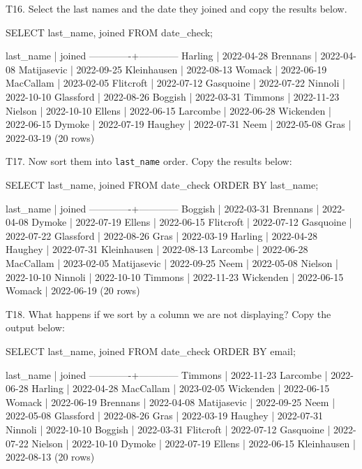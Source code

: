 T16. Select the last names and the date they joined and copy the results below. 
\begin{sql}
SELECT last_name, joined FROM date_check;
\end{sql}
\begin{pseudo}
  last_name  |   joined
-------------+------------
 Harling     | 2022-04-28
 Brennans    | 2022-04-08
 Matijasevic | 2022-09-25
 Kleinhausen | 2022-08-13
 Womack      | 2022-06-19
 MacCallam   | 2023-02-05
 Flitcroft   | 2022-07-12
 Gasquoine   | 2022-07-22
 Ninnoli     | 2022-10-10
 Glassford   | 2022-08-26
 Boggish     | 2022-03-31
 Timmons     | 2022-11-23
 Nielson     | 2022-10-10
 Ellens      | 2022-06-15
 Larcombe    | 2022-06-28
 Wickenden   | 2022-06-15
 Dymoke      | 2022-07-19
 Haughey     | 2022-07-31
 Neem        | 2022-05-08
 Gras        | 2022-03-19
(20 rows)
\end{pseudo}

T17. Now sort them into \verb|last_name| order. Copy the results below:
\begin{sql}
SELECT last_name, joined FROM date_check
ORDER BY last_name;
\end{sql}
\begin{pseudo}
  last_name  |   joined
-------------+------------
 Boggish     | 2022-03-31
 Brennans    | 2022-04-08
 Dymoke      | 2022-07-19
 Ellens      | 2022-06-15
 Flitcroft   | 2022-07-12
 Gasquoine   | 2022-07-22
 Glassford   | 2022-08-26
 Gras        | 2022-03-19
 Harling     | 2022-04-28
 Haughey     | 2022-07-31
 Kleinhausen | 2022-08-13
 Larcombe    | 2022-06-28
 MacCallam   | 2023-02-05
 Matijasevic | 2022-09-25
 Neem        | 2022-05-08
 Nielson     | 2022-10-10
 Ninnoli     | 2022-10-10
 Timmons     | 2022-11-23
 Wickenden   | 2022-06-15
 Womack      | 2022-06-19
(20 rows)
\end{pseudo}

T18. What happens if we sort by a column we are not displaying? Copy the output below:
\begin{sql}
SELECT last_name, joined FROM date_check
ORDER BY email;
\end{sql}
\begin{pseudo}
  last_name  |   joined
-------------+------------
 Timmons     | 2022-11-23
 Larcombe    | 2022-06-28
 Harling     | 2022-04-28
 MacCallam   | 2023-02-05
 Wickenden   | 2022-06-15
 Womack      | 2022-06-19
 Brennans    | 2022-04-08
 Matijasevic | 2022-09-25
 Neem        | 2022-05-08
 Glassford   | 2022-08-26
 Gras        | 2022-03-19
 Haughey     | 2022-07-31
 Ninnoli     | 2022-10-10
 Boggish     | 2022-03-31
 Flitcroft   | 2022-07-12
 Gasquoine   | 2022-07-22
 Nielson     | 2022-10-10
 Dymoke      | 2022-07-19
 Ellens      | 2022-06-15
 Kleinhausen | 2022-08-13
(20 rows)
\end{pseudo}

